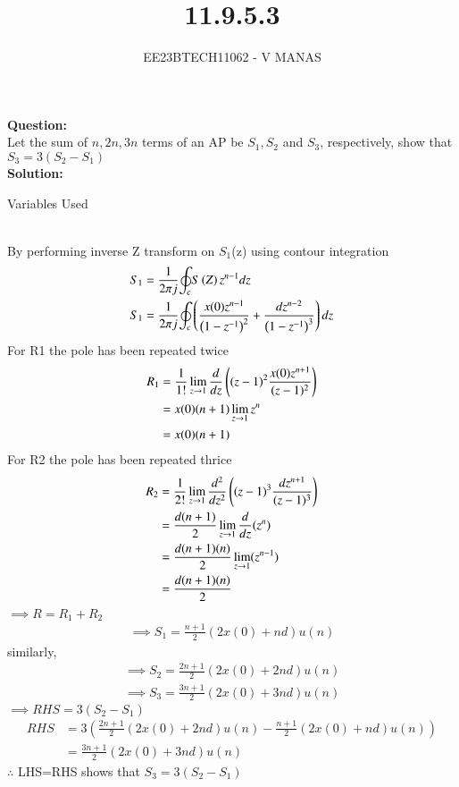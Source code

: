 \documentclass[journal,12pt,twocolumn]{IEEEtran}
\theoremstyle{remark}
\begin{document}

\vspace{3cm}

\title{11.9.5.3}
\author{EE23BTECH11062 - V MANAS}
\maketitle
\newpage

\bigskip
\textbf{Question:}\\Let the sum of $n,2n,3n$ terms of an AP be $S_1,S_2$ and $S_3$, respectively, show that $S_3=3(S_2-S_1)$\\
\textbf{Solution:}
\begin{table}[h]
    \centering
    
    \caption{Variables Used}
    \label{tab:table_11.9.5.3}
\end{table}\\
By performing inverse Z transform on $S_1$(z) using contour integration
\begin{align}
    S_1&=\frac{1}{2{\pi}j}{\oint_c}S\left(Z\right)z^{n-1}dz\\
    S_1&=\frac{1}{2{\pi}j}{\oint_c}\left(\frac{x(0)z^{n-1}}{\left(1-z^{-1}\right)^2}+\frac{dz^{n-2}}{\left(1-z^{-1}\right)^3}\right)dz
\end{align}
For R1 the pole has been repeated twice
\begin{align}
    R_1&=\frac{1}{1!}\lim_{z\to 1}\frac{d}{dz}\left((z-1)^2\frac{x(0)z^{n+1}}{(z-1)^2}\right)\\
    &=x(0)(n+1)\lim_{z\to 1}z^n\\
    &=x(0)(n+1)
\end{align}
For R2 the pole has been repeated thrice
\begin{align}
    R_2&=\frac{1}{2!}\lim_{z\to 1}\frac{d^2}{dz^2}\left((z-1)^3\frac{dz^{n+1}}{(z-1)^3}\right)\\
    &=\frac{d(n+1)}{2}\lim_{z\to 1}\frac{d}{dz}(z^n)\\
    &=\frac{d(n+1)(n)}{2}\lim_{z\to 1}(z^{n-1})\\
    &=\frac{d(n+1)(n)}{2}
\end{align}
$\implies R=R_1+R_2$
\begin{align}
    \implies S_1=\frac{n+1}{2}(2x(0)+nd)u(n)
\end{align}
similarly,
\begin{align}
    \implies S_2=\frac{2n+1}{2}(2x(0)+2nd)u(n)\\
    \implies S_3=\frac{3n+1}{2}(2x(0)+3nd)u(n)
\end{align}
$\implies RHS=3(S_2-S_1)$
\begin{align}
    RHS&=3(\frac{2n+1}{2}(2x(0)+2nd)u(n)-\frac{n+1}{2}(2x(0)+nd)u(n))\\
    &=\frac{3n+1}{2}(2x(0)+3nd)u(n)
\end{align}
$\therefore$ LHS=RHS shows that $S_3=3(S_2-S_1)$
\end{document}
